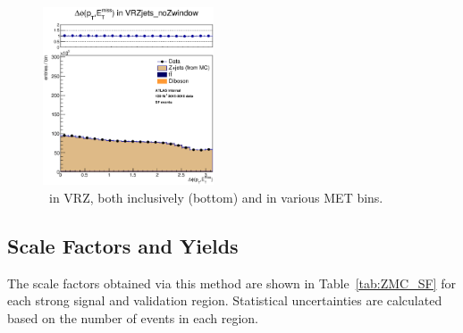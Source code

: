\begin{figure}[htbp]
\includegraphics[width=0.45\textwidth]{Images/SUSY/reweight_Ptll_all_SF_dPhiPllMet_VRZ.eps}
\caption{\dphiptllmet\ in VRZ, both inclusively (bottom) and in various MET bins.}
\label{fig:VRZ_dPhiPtllMET}
\end{figure}

\subsection*{Scale Factors and Yields}

The scale factors obtained via this method are shown in Table~\ref{tab:ZMC_SF} for each strong signal and validation region. Statistical uncertainties are calculated based on the number of events in each region.

